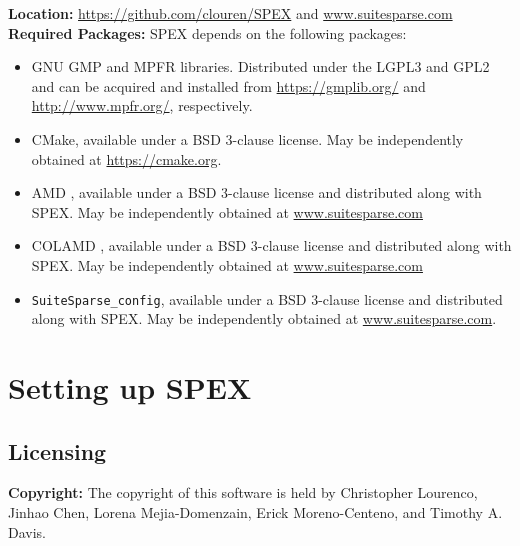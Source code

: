 \documentclass[12pt,oneside]{book}
\theoremstyle{definition}
\begin{document}
\noindent \textbf{Location:} \url{https://github.com/clouren/SPEX} and
\url{www.suitesparse.com}\\

\noindent \textbf{Required Packages:} SPEX depends on the following packages:
\begin{itemize} 
    \item GNU GMP \cite{granlund2015gnu} and MPFR \cite{fousse2007mpfr} libraries. Distributed under the LGPL3 and GPL2 and can be acquired and installed from \url{https://gmplib.org/} and \url{http://www.mpfr.org/}, respectively.

    \item CMake, available under a BSD 3-clause license. May be independently obtained at \url{https://cmake.org}.
    
    \item AMD \cite{amestoy1996approximate,amestoy2004algorithmamd}, available under a BSD 3-clause license and distributed along with SPEX. May be independently obtained at \url{www.suitesparse.com}
    
    \item COLAMD \cite{davis2004column,davis2004algorithmcolamd}, available under a BSD 3-clause license and distributed along with SPEX. May be independently obtained at \url{www.suitesparse.com}
    
    \item \verb|SuiteSparse_config|, available under a BSD 3-clause
        license and distributed along with SPEX.
        May be independently obtained at \url{www.suitesparse.com}.
\end{itemize}



\chapter{Setting up SPEX}\vspace{-0.75in}

\section{Licensing} \label{s:util:licensing}
\textbf{Copyright:} The copyright of this software is held by Christopher Lourenco, Jinhao Chen, Lorena Mejia-Domenzain, Erick Moreno-Centeno, and Timothy A. Davis.\\
\end{document}
